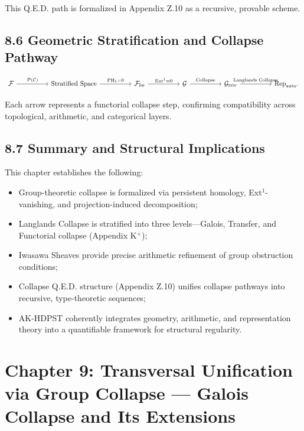 \documentclass[11pt]{article}
\begin{document}
This Q.E.D. path is formalized in Appendix Z.10 as a recursive, provable scheme.

\subsection*{8.6 Geometric Stratification and Collapse Pathway}

\[
\begin{tikzcd}[column sep=huge]
\mathcal{F} \arrow[r, "\mathcal{P}(\mathcal{C})"]
& \text{Stratified Space} \arrow[r, "\mathrm{PH}_1 = 0"]
& \mathcal{F}_{\mathrm{Iw}} \arrow[r, "\mathrm{Ext}^1 = 0"]
& \mathcal{G} \arrow[r, "\text{Collapse}"]
& \mathcal{G}_{\mathrm{triv}} \arrow[r, "\text{Langlands Collapse}"]
& \mathrm{Rep}_{\mathrm{auto}}.
\end{tikzcd}
\]

Each arrow represents a functorial collapse step, confirming compatibility across topological, arithmetic, and categorical layers.

\subsection*{8.7 Summary and Structural Implications}

This chapter establishes the following:

\begin{itemize}
    \item Group-theoretic collapse is formalized via persistent homology, Ext$^1$-vanishing, and projection-induced decomposition;
    \item Langlands Collapse is stratified into three levels—Galois, Transfer, and Functorial collapse (Appendix K$^+$);
    \item Iwasawa Sheaves provide precise arithmetic refinement of group obstruction conditions;
    \item Collapse Q.E.D. structure (Appendix Z.10) unifies collapse pathways into recursive, type-theoretic sequences;
    \item AK-HDPST coherently integrates geometry, arithmetic, and representation theory into a quantifiable framework for structural regularity.
\end{itemize}



\section{Chapter 9: Transversal Unification via Group Collapse — Galois Collapse and Its Extensions}
\end{document}

